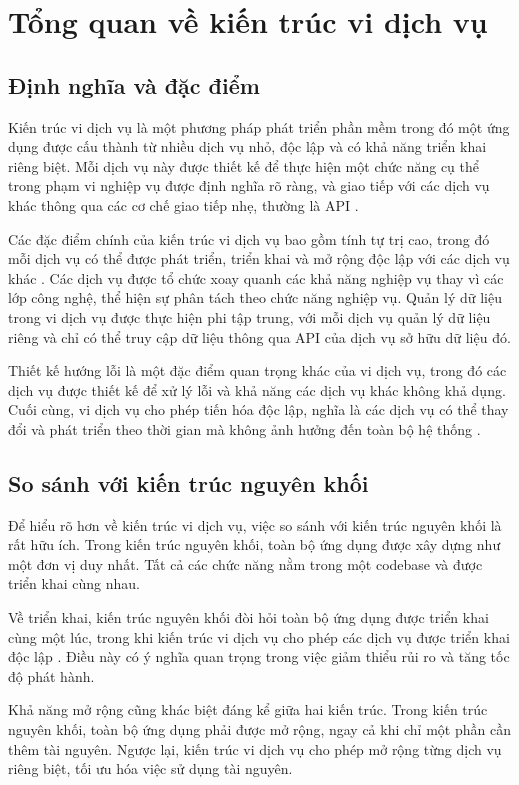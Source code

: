 \section{Tổng quan về kiến trúc vi dịch vụ}

\subsection{Định nghĩa và đặc điểm}
Kiến trúc vi dịch vụ là một phương pháp phát triển phần mềm trong đó một ứng
dụng được cấu thành từ nhiều dịch vụ nhỏ, độc lập và có khả năng triển khai
riêng biệt. Mỗi dịch vụ này được thiết kế để thực hiện một chức năng cụ thể
trong phạm vi nghiệp vụ được định nghĩa rõ ràng, và giao tiếp với các dịch vụ
khác thông qua các cơ chế giao tiếp nhẹ, thường là API \cite{fowler2014}.

Các đặc điểm chính của kiến trúc vi dịch vụ bao gồm tính tự trị cao, trong đó mỗi dịch vụ có thể được phát triển, triển khai và mở rộng độc lập với các dịch vụ khác \cite{newman2015}. Các dịch vụ được tổ chức xoay quanh các khả năng
nghiệp vụ thay vì các lớp công nghệ, thể hiện sự phân tách theo chức năng
nghiệp vụ. Quản lý dữ liệu trong vi dịch vụ được thực hiện phi tập trung, với
mỗi dịch vụ quản lý dữ liệu riêng và chỉ có thể truy cập dữ liệu thông qua API
của dịch vụ sở hữu dữ liệu đó.

Thiết kế hướng lỗi là một đặc điểm quan trọng khác của vi dịch vụ, trong đó
các dịch vụ được thiết kế để xử lý lỗi và khả năng các dịch vụ khác không khả
dụng. Cuối cùng, vi dịch vụ cho phép tiến hóa độc lập, nghĩa là các dịch vụ
có thể thay đổi và phát triển theo thời gian mà không ảnh hưởng đến toàn bộ hệ
thống \cite{richardson2019}.

\subsection{So sánh với kiến trúc nguyên khối}
Để hiểu rõ hơn về kiến trúc vi dịch vụ, việc so sánh với kiến trúc nguyên khối là rất hữu ích. Trong kiến trúc nguyên khối, toàn bộ ứng dụng được xây dựng như một đơn vị duy nhất. Tất cả các chức năng nằm trong một codebase và được triển khai cùng nhau.

Về triển khai, kiến trúc nguyên khối đòi hỏi toàn bộ ứng dụng được triển khai
cùng một lúc, trong khi kiến trúc vi dịch vụ cho phép các dịch vụ được triển
khai độc lập \cite{newman2015}. Điều này có ý nghĩa quan trọng trong việc giảm thiểu rủi ro và tăng tốc độ phát hành.

Khả năng mở rộng cũng khác biệt đáng kể giữa hai kiến trúc. Trong kiến trúc
nguyên khối, toàn bộ ứng dụng phải được mở rộng, ngay cả khi chỉ một phần cần
thêm tài nguyên. Ngược lại, kiến trúc vi dịch vụ cho phép mở rộng từng dịch
vụ riêng biệt, tối ưu hóa việc sử dụng tài nguyên.


